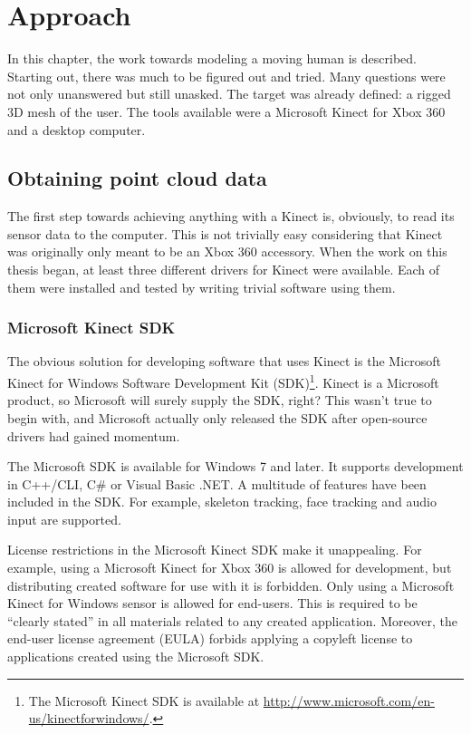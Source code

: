 \chapter{Approach}

In this chapter, the work towards modeling a moving human is described. Starting out, there was much to be figured out and tried. Many questions were not only unanswered but still unasked. The target was already defined: a rigged 3D mesh of the user. The tools available were a Microsoft Kinect for Xbox 360 and a desktop computer.

\section{Obtaining point cloud data}

The first step towards achieving anything with a Kinect is, obviously, to read its sensor data to the computer. This is not trivially easy considering that Kinect was originally only meant to be an Xbox 360 accessory. When the work on this thesis began, at least three different drivers for Kinect were available. Each of them were installed and tested by writing trivial software using them.

\subsection{Microsoft Kinect SDK}

The obvious solution for developing software that uses Kinect is the Microsoft Kinect for Windows Software Development Kit (SDK)\footnote{The Microsoft Kinect SDK is available at \url{http://www.microsoft.com/en-us/kinectforwindows/}.}. Kinect is a Microsoft product, so Microsoft will surely supply the SDK, right? This wasn't true to begin with, and Microsoft actually only released the SDK after open-source drivers had gained momentum.

The Microsoft SDK is available for Windows 7 and later. It supports development in C++/CLI, C# or Visual Basic .NET. A multitude of features have been included in the SDK. For example, skeleton tracking, face tracking and audio input are supported.

License restrictions in the Microsoft Kinect SDK make it unappealing. For example, using a Microsoft Kinect for Xbox 360 is allowed for development, but distributing created software for use with it is forbidden. Only using a Microsoft Kinect for Windows sensor is allowed for end-users. This is required to be ``clearly stated'' in all materials related to any created application. Moreover, the end-user license agreement (EULA) forbids applying a copyleft license to applications created using the Microsoft SDK. \citep{kinectEULA}

